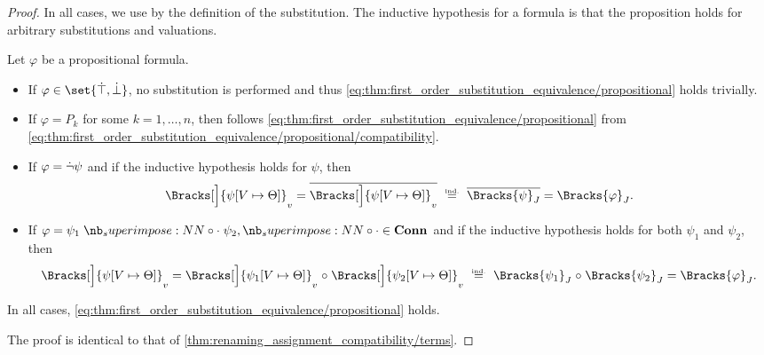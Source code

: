 \begin{proof}
  In all cases, we use  by the definition of the substitution. The inductive hypothesis for a formula is that the proposition holds for arbitrary substitutions and valuations.

   Let \( \varphi \) be a propositional formula.
  \begin{itemize}
    \item If \( \varphi \in \set{ \syntop, \synbot } \), no substitution is performed and thus \eqref{eq:thm:first_order_substitution_equivalence/propositional} holds trivially.

    \item If \( \varphi = P_k \) for some \( k = 1, \ldots, n \), then follows \eqref{eq:thm:first_order_substitution_equivalence/propositional} from \eqref{eq:thm:first_order_substitution_equivalence/propositional/compatibility}.

    \item If \( \varphi = \dot{\neg} \psi \) and if the inductive hypothesis holds for \( \psi \), then
    \begin{equation*}
      \Bracks[\Big]{ \psi[V \mapsto \Theta] }_v
      =
      \oline{\Bracks[\Big]{ \psi[V \mapsto \Theta] }_v}
      \reloset {\T{ind.}} =
      \oline{\Bracks{\psi}_J}
      =
      \Bracks{\varphi}_J.
    \end{equation*}

    \item If \( \varphi = \psi_1 \syncirc \psi_2, {\syncirc} \in \op*{Conn} \) and if the inductive hypothesis holds for both \( \psi_1 \) and \( \psi_2 \), then
    \begin{equation*}
      \Bracks[\Big]{ \psi[V \mapsto \Theta] }_v
      =
      \Bracks[\Big]{ \psi_1[V \mapsto \Theta] }_v \relcirc \Bracks[\Big]{ \psi_2[V \mapsto \Theta] }_v
      \reloset {\T{ind.}} =
      \Bracks{\psi_1}_J \relcirc \Bracks{\psi_2}_J
      =
      \Bracks{\varphi}_J.
    \end{equation*}
  \end{itemize}

  In all cases, \eqref{eq:thm:first_order_substitution_equivalence/propositional} holds.

   The proof is identical to that of \cref{thm:renaming_assignment_compatibility/terms}.


\end{proof}
